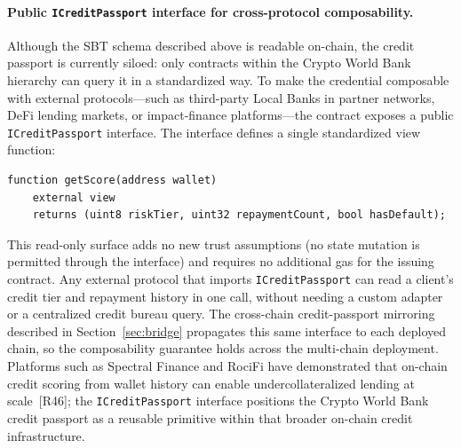 \documentclass[12pt,a4paper]{report}
\begin{document}
\paragraph{Public \texttt{ICreditPassport} interface for cross-protocol composability.}
Although the SBT schema described above is readable on-chain, the credit passport is currently siloed: only contracts within the Crypto World Bank hierarchy can query it in a standardized way.  To make the credential composable with external protocols---such as third-party Local Banks in partner networks, DeFi lending markets, or impact-finance platforms---the contract exposes a public \texttt{ICreditPassport} interface.  The interface defines a single standardized view function:
\begin{verbatim}
function getScore(address wallet)
    external view
    returns (uint8 riskTier, uint32 repaymentCount, bool hasDefault);
\end{verbatim}
This read-only surface adds no new trust assumptions (no state mutation is permitted through the interface) and requires no additional gas for the issuing contract.  Any external protocol that imports \texttt{ICreditPassport} can read a client's credit tier and repayment history in one call, without needing a custom adapter or a centralized credit bureau query.  The cross-chain credit-passport mirroring described in Section~\ref{sec:bridge} propagates this same interface to each deployed chain, so the composability guarantee holds across the multi-chain deployment.  Platforms such as Spectral Finance and RociFi have demonstrated that on-chain credit scoring from wallet history can enable undercollateralized lending at scale~[R46]; the \texttt{ICreditPassport} interface positions the Crypto World Bank credit passport as a reusable primitive within that broader on-chain credit infrastructure.
\end{document}
